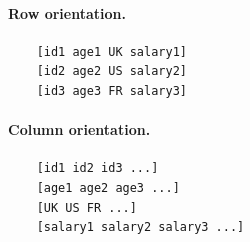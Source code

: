 \begin{figure}[h]
    \centering
    
    \begin{minipage}[t]{0.47\linewidth}
    \paragraph{Row orientation.}
    
    \begin{verbatim}
    [id1 age1 UK salary1]
    [id2 age2 US salary2]
    [id3 age3 FR salary3]
    \end{verbatim}
    
    \end{minipage}
    \hfill
    \begin{minipage}[t]{0.47\linewidth}
    \paragraph{Column orientation.}
    
    \begin{verbatim}
    [id1 id2 id3 ...]
    [age1 age2 age3 ...]
    [UK US FR ...]
    [salary1 salary2 salary3 ...]
    \end{verbatim}
    \end{minipage}
\end{figure}



